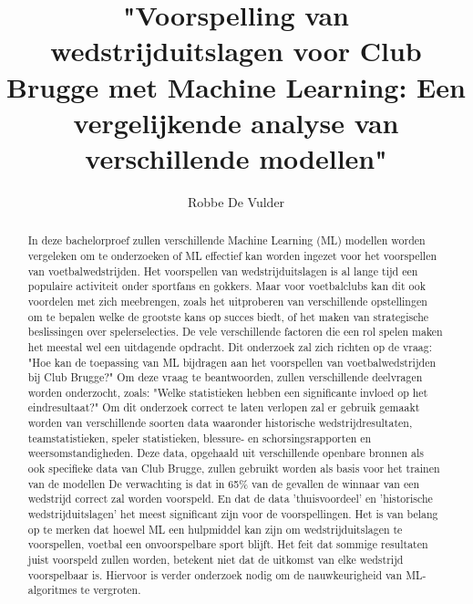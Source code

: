 \documentclass{hogent-article}
\title{"Voorspelling van wedstrijduitslagen voor Club Brugge met Machine Learning: Een vergelijkende analyse van verschillende modellen"}
\author{Robbe De Vulder}
\begin{document}
\begin{abstract}

In deze bachelorproef zullen verschillende Machine Learning (ML) modellen worden vergeleken om te onderzoeken of ML effectief kan worden ingezet voor het voorspellen van voetbalwedstrijden. Het voorspellen van wedstrijduitslagen is al lange tijd een populaire activiteit onder sportfans en gokkers. Maar voor voetbalclubs kan dit ook voordelen met zich meebrengen, zoals het uitproberen van verschillende opstellingen om te bepalen welke de grootste kans op succes biedt, of het maken van strategische beslissingen over spelerselecties. De vele verschillende factoren die een rol spelen maken het meestal wel een uitdagende opdracht.
Dit onderzoek zal zich richten op de vraag: "Hoe kan de toepassing van ML bijdragen aan het voorspellen van voetbalwedstrijden bij Club Brugge?" Om deze vraag te beantwoorden, zullen verschillende deelvragen worden onderzocht, zoals: "Welke statistieken hebben een significante invloed op het eindresultaat?"
Om dit onderzoek correct te laten verlopen zal er gebruik gemaakt worden van verschillende soorten data waaronder historische wedstrijdresultaten, teamstatistieken, speler statistieken, blessure- en schorsingsrapporten en weersomstandigheden. Deze data, opgehaald uit verschillende openbare bronnen als ook specifieke data van Club Brugge, zullen gebruikt worden als basis voor het trainen van de modellen
De verwachting is dat in 65\% van de gevallen de winnaar van een wedstrijd correct zal worden voorspeld.  En dat de data 'thuisvoordeel' en 'historische wedstrijduitslagen' het meest significant zijn voor de voorspellingen.
Het is van belang op te merken dat hoewel ML een hulpmiddel kan zijn om wedstrijduitslagen te voorspellen, voetbal een onvoorspelbare sport blijft. Het feit dat sommige resultaten juist voorspeld zullen worden, betekent niet dat de uitkomst van elke wedstrijd voorspelbaar is. Hiervoor is verder onderzoek nodig om de nauwkeurigheid van ML-algoritmes te vergroten.  

\end{abstract}

\tableofcontents



\printbibliography[heading=bibintoc]
\end{document}
